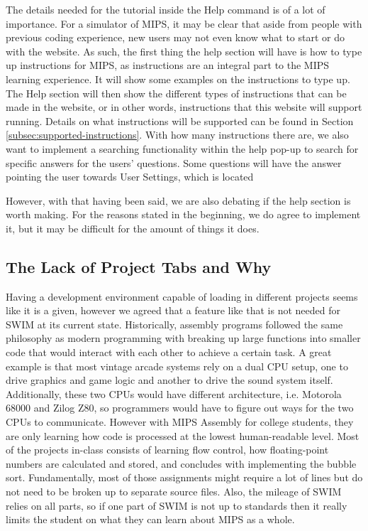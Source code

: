 \documentclass[
    paper=letter,
    parskip=half,
    fontsize=12pt,
    titlepage=firstiscover,
    toc=bibliography,
    numbers=endperiod
]{scrartcl}
\begin{document}
The details needed for the tutorial inside the Help command is of a lot
of importance. For a simulator of MIPS, it may be clear that aside from
people with previous coding experience, new users may not even know what
to start or do with the website. As such, the first thing the help
section will have is how to type up instructions for MIPS, as
instructions are an integral part to the MIPS learning experience. It
will show some examples on the instructions to type up. The Help section
will then show the different types of instructions that can be made in
the website, or in other words, instructions that this website will
support running. Details on what instructions will be supported can be
found in Section \ref{subsec:supported-instructions}. With how many
instructions there are, we also want to implement a searching
functionality within the help pop-up to search for specific answers for
the users' questions. Some questions will have the answer pointing the
user towards User Settings, which is located

However, with that having been said, we are also debating if the help
section is worth making. For the reasons stated in the beginning, we do
agree to implement it, but it may be difficult for the amount of things
it does.

\subsection{The Lack of Project Tabs and Why}
\label{subsec:lack-of-project-tabs}

Having a development environment capable of loading in different
projects seems like it is a given, however we agreed that a feature like
that is not needed for SWIM at its current state. Historically, assembly
programs followed the same philosophy as modern programming with
breaking up large functions into smaller code that would interact with
each other to achieve a certain task. A great example is that most
vintage arcade systems rely on a dual CPU setup, one to drive graphics
and game logic and another to drive the sound system itself.
Additionally, these two CPUs would have different architecture, i.e.
Motorola 68000 and Zilog Z80, so programmers would have to figure out
ways for the two CPUs to communicate. However with MIPS Assembly for
college students, they are only learning how code is processed at the
lowest human-readable level. Most of the projects in-class consists of
learning flow control, how floating-point numbers are calculated and
stored, and concludes with implementing the bubble sort. Fundamentally,
most of those assignments might require a lot of lines but do not need
to be broken up to separate source files. Also, the mileage of SWIM
relies on all parts, so if one part of SWIM is not up to standards then
it really limits the student on what they can learn about MIPS as a
whole.
\end{document}
